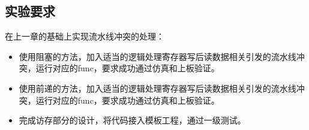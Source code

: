 \subsection{实验要求}

在上一章的基础上实现流水线冲突的处理：

\begin{itemize}
    \item 使用阻塞的方法，加入适当的逻辑处理寄存器写后读数据相关引发的流水线冲突，运行对应的func，要求成功通过仿真和上板验证。
    \item 使用前递的方法，加入适当的逻辑处理寄存器写后读数据相关引发的流水线冲突，运行对应的func，要求成功通过仿真和上板验证。
    \item 完成访存部分的设计，将代码接入模板工程，通过一级测试。
\end{itemize}

